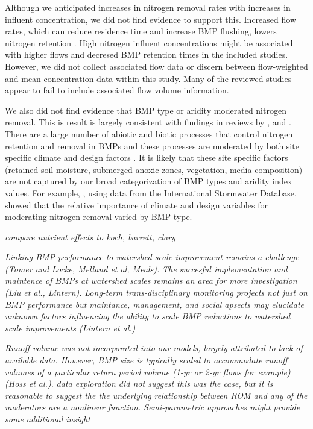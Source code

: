\documentclass[utf8]{FrontiersinHarvard}
\begin{document}
Although we anticipated increases in nitrogen removal rates with increases in influent concentration, we did not find evidence to support this.
Increased flow rates, which can reduce residence time and increase BMP flushing, lowers nitrogen retention \citep{wollheimRetentionUrbanizingHeadwater2005, craigStreamRestorationStrategies2008}.
High nitrogen influent concentrations might be associated with higher flows and decresed BMP retention times in the included studies.
However, we did not collect associated flow data or discern between flow-weighted and mean concentration data within this study.
Many of the reviewed studies appear to fail to include associated flow volume information.

We also did not find evidence that BMP type or aridity moderated nitrogen removal.
This is result is largely consistent with findings in reviews by \citet{kochNitrogenRemovalStormwater2014}, \citet{hagerPerformanceLowimpactDevelopment2019} and \citet{horvathEffectsRegionalClimate2023}.
There are a large number of abiotic and biotic processes that control nitrogen retention and removal in BMPs and these processes are moderated by both site specific climate and design factors \citep{lefevreReviewDissolvedPollutants2015, valencaNitrateRemovalUncertainty2021}.
It is likely that these site specific factors (retained soil moisture, submerged anoxic zones, vegetation, media composition) are not captured by our broad categorization of BMP types and aridity index values.
For example, \citet{valencaNitrateRemovalUncertainty2021}, using data from the International Stormwater Database, showed that the relative importance of climate and design variables for moderating nitrogen removal varied by BMP type.

\emph{compare nutrient effects to koch, barrett, clary}

\emph{Linking BMP performance to watershed scale improvement remains a challenge (Tomer and Locke, Melland et al, Meals).}
\emph{The succesful implementation and maintence of BMPs at watershed scales remains an area for more investigation (Liu et al., Lintern).}
\emph{Long-term trans-disciplinary monitoring projects not just on BMP performance but maintance, management, and social apsects may elucidate unknown factors influencing the ability to scale BMP reductions to watershed scale improvements (Lintern et al.)}

\emph{Runoff volume was not incorporated into our models, largely attributed to lack of available data. However, BMP size is typically scaled to accommodate runoff volumes of a particular return period volume (1-yr or 2-yr flows for example) (Hoss et al.).}
\emph{data exploration did not suggest this was the case, but it is reasonable to suggest the the underlying relationship between ROM and any of the moderators are a nonlinear function. Semi-parametric approaches might provide some additional insight}
\end{document}
